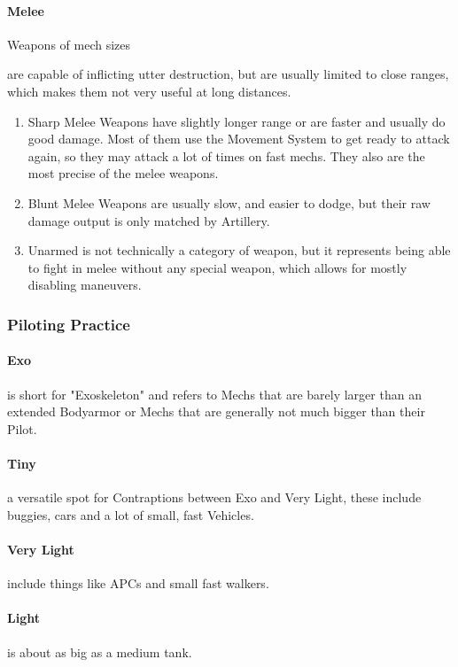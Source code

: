         \paragraph{Melee} Weapons of mech sizes \par are capable of inflicting utter destruction, but are usually
        limited to close ranges, which makes them not very useful at long distances.
        \begin{enumerate}[label= -]
            \item{Sharp} Melee Weapons have slightly longer range or are faster and usually do good damage.
            Most of them
            use the Movement System to get ready to attack again, so they may attack a lot of times on fast mechs.
            They also are the most precise of the melee weapons.
            \item{Blunt} Melee Weapons are usually slow, and easier to dodge, but their raw damage output is only
            matched by Artillery.
            \item{Unarmed} is not technically a category of weapon, but it represents being able to fight in melee
            without any special weapon, which allows for mostly disabling maneuvers.
        \end{enumerate}
    \subsubsection{Piloting Practice}
        \paragraph{Exo} is short for "Exoskeleton" and refers to Mechs that are barely larger than an extended Bodyarmor
        or Mechs that are generally not much bigger than their Pilot.
        \paragraph{Tiny} a versatile spot for Contraptions between Exo and Very Light, these include buggies, cars and
        a lot of small, fast Vehicles.
        \paragraph{Very Light} include things like APCs and small fast walkers.
        \paragraph{Light} is about as big as a medium tank.
